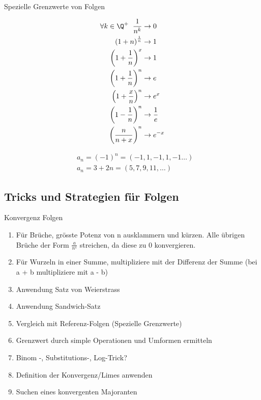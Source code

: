 \begin{highlight}{Spezielle Grenzwerte von Folgen}
\begin{center}
        \begin{minipage}{0.3\linewidth}
            \begin{align*}
                \forall k \in \Q^+ \hspace{2mm}\frac{1}{n^k} &\to 0\\
                \left(1 + n\right)^{\frac{1}{n}} &\to 1\\
                \left(1 + \frac{1}{n}\right)^x &\to 1\\
                \left(1 + \frac{1}{n}\right)^n &\to e\\
                \left(1 + \frac{x}{n}\right)^n &\to e^x\\
                \left(1 - \frac{1}{n}\right)^n &\to \frac{1}{e}\\
                \left(\frac{n}{n + x}\right)^n &\to e^{-x}
            \end{align*}
        \end{minipage}
    \end{center}
    \begin{align*}
        &a_{n}=(-1)^{n}=(-1,1,-1,1,-1 \ldots) \\
        &a_{n}=3+2 n=(5,7,9,11, \ldots)
    \end{align*}
\end{highlight}

\subsection{Tricks und Strategien für Folgen}

\begin{KR}{Konvergenz Folgen}
    \begin{enumerate}
        \item Für Brüche, grösste Potenz von n ausklammern und kürzen. Alle übrigen Brüche der Form $\frac{a}{n^s}$ streichen, da diese zu 0 konvergieren.
        \item Für Wurzeln in einer Summe, multipliziere mit der Differenz der Summe (bei a + b multipliziere mit a - b)
        \item Anwendung Satz von Weierstrass
        \item Anwendung Sandwich-Satz
        \item Vergleich mit Referenz-Folgen (Spezielle Grenzwerte)
        \item Grenzwert durch simple Operationen und Umformen ermitteln
        \item Binom -, Substitutions-, Log-Trick?
        \item Definition der Konvergenz/Limes anwenden
        \item Suchen eines konvergenten Majoranten
    \end{enumerate}
\end{KR}

